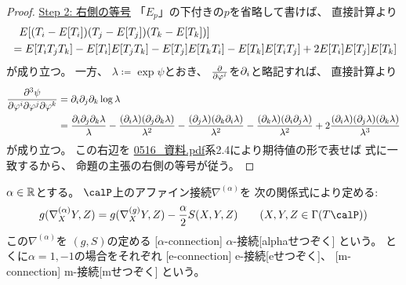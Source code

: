 \documentclass[report]{jlreq}
\begin{document}
\begin{proof}
    \uline{Step 2: 右側の等号} \quad
    「$E_p$」の下付きの$p$を省略して書けば、
    直接計算より
    \begin{alignat}{1}
        &\phantom{=}
            E[(T_i - E[T_i])(T_j - E[T_j])(T_k - E[T_k])]
            \\
        &=
            E[T_i T_j T_k]
            - E[T_i] E[T_j T_k]
            - E[T_j] E[T_k T_i]
            - E[T_k] E[T_i T_j]
            + 2 E[T_i] E[T_j] E[T_k]
            \locallabel{eq:1}
    \end{alignat}
    が成り立つ。
    一方、
    $\lambda \coloneqq \exp \psi$とおき、
    $\deldel{\varphi^i}$を$\partial_i$と略記すれば、
    直接計算より
    \begin{alignat}{1}
        \frac{\partial^3 \psi}{\partial \varphi^i \partial \varphi^j \partial \varphi^k}
            &=
                \partial_i
                \partial_j
                \partial_k
                \log \lambda
                \\
            &=
                \frac{\partial_i \partial_j \partial_k \lambda}{\lambda}
                - \frac{(\partial_i \lambda) (\partial_j \partial_k \lambda)}{\lambda^2}
                - \frac{(\partial_j \lambda) (\partial_k \partial_i \lambda)}{\lambda^2}
                - \frac{(\partial_k \lambda) (\partial_i \partial_j \lambda)}{\lambda^2}
                + 2 \frac{(\partial_i \lambda) (\partial_j \lambda) (\partial_k \lambda)}{\lambda^3}
    \end{alignat}
    が成り立つ。
    この右辺を
    \url{0516_資料.pdf}系2.4により期待値の形で表せば
    式に一致するから、
    命題の主張の右側の等号が従う。
\end{proof}

\begin{definition}[$\alpha$-接続]
    $\alpha \in \mathbb{R}$とする。
    $\calP$上のアファイン接続$\nabla^{(\alpha)}$を
    次の関係式により定める:
    \begin{equation}
        g(\nabla^{(\alpha)}_X Y, Z)
            =
                g(\nabla^{(g)}_X Y, Z)
                -
                \frac{\alpha}{2} S(X, Y, Z)
                \qquad
                (X, Y, Z \in \Gamma(T\calP))
    \end{equation}
    この$\nabla^{(\alpha)}$を
    $(g, S)$の定める
    [$\alpha$-connection]
        {$\alpha$-接続}[alphaせつぞく]
    という。
    とくに$\alpha = 1, -1$の場合をそれぞれ
    [e-connection]
        {e-接続}[eせつぞく]、
    [m-connection]
        {m-接続}[mせつぞく]
    という。
\end{definition}
\end{document}
